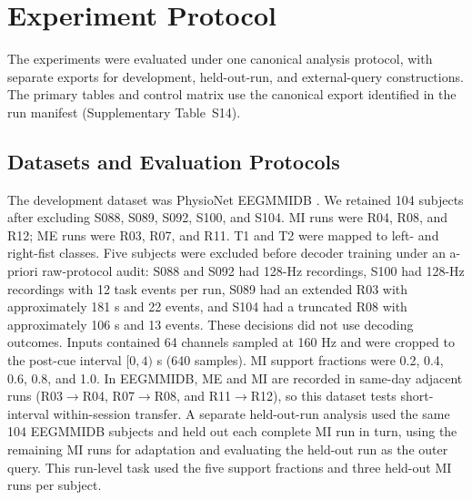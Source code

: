 \documentclass[preprint,12pt]{elsarticle}
\begin{document}
\section{Experiment Protocol}
The experiments were evaluated under one canonical analysis protocol, with
separate exports for development, held-out-run, and external-query
constructions. The primary tables and control matrix use the canonical export
identified in the run manifest (Supplementary Table~S14).

\subsection{Datasets and Evaluation Protocols}\label{sec:data}
The development dataset was PhysioNet EEGMMIDB \cite{goldberger2000physiobank,schalk2004bci}. We retained 104 subjects after excluding S088, S089, S092, S100, and S104. MI runs were R04, R08, and R12; ME runs were R03, R07, and R11. T1 and T2 were mapped to left- and right-fist classes. Five subjects were excluded before decoder training under an a-priori raw-protocol audit: S088 and S092 had 128-Hz recordings, S100 had 128-Hz recordings with 12 task events per run, S089 had an extended R03 with approximately 181 s and 22 events, and S104 had a truncated R08 with approximately 106 s and 13 events. These decisions did not use decoding outcomes. Inputs contained 64 channels sampled at 160 Hz and were cropped to the post-cue interval $[0,4)$ s (640 samples). MI support fractions were 0.2, 0.4, 0.6, 0.8, and 1.0. In EEGMMIDB, ME and MI are recorded in same-day adjacent runs (R03$\rightarrow$R04, R07$\rightarrow$R08, and R11$\rightarrow$R12), so this dataset tests short-interval within-session transfer. A separate held-out-run analysis used the same 104 EEGMMIDB subjects and held out each complete MI run in turn, using the remaining MI runs for adaptation and evaluating the held-out run as the outer query. This run-level task used the five support fractions and three held-out MI runs per subject.
\end{document}
